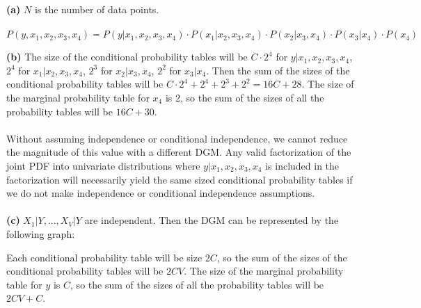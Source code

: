 \documentclass[submit]{harvardml}
\begin{document}


\textbf{(a)} $N$ is the number of data points.\\\\
$P(y,x_1,x_2,x_3,x_4)=P(y|x_1,x_2,x_3,x_4)\cdot P(x_1|x_2,x_3,x_4)\cdot P(x_2|x_3,x_4)\cdot P(x_3|x_4)\cdot P(x_4)$
\begin{center}
\end{center}

\textbf{(b)} The size of the conditional probability tables will be $C\cdot2^4$ for $y|x_1,x_2,x_3,x_4$,  $2^4$ for $x_1|x_2,x_3,x_4$,  $2^3$ for $x_2|x_3,x_4$, $2^2$ for $x_3|x_4$. Then the sum of the sizes of the conditional probability tables will be $C\cdot2^4+2^4+2^3+2^2=16C+28$. The size of the marginal probability table for $x_4$ is $2$, so the sum of the sizes of all the probability tables will be $16C+30$.\\\\
Without assuming independence or conditional independence, we cannot reduce the magnitude of this value with a different DGM. Any valid factorization of the joint PDF into univariate distributions where $y|x_1,x_2,x_3,x_4$ is included in the factorization will necessarily yield the same sized conditional probability tables if we do not make independence or conditional independence assumptions.\\\\

\textbf{(c)} $X_1|Y,...,X_V|Y$ are independent. Then the DGM can be represented by the following graph:
\begin{center}
\end{center}
Each conditional probability table will be size $2C$, so the sum of the sizes of the conditional probability tables will be $2CV$. The size of the marginal probability table for $y$ is $C$, so the sum of the sizes of all the probability tables will be $2CV+C$.\\\\
\end{document}

